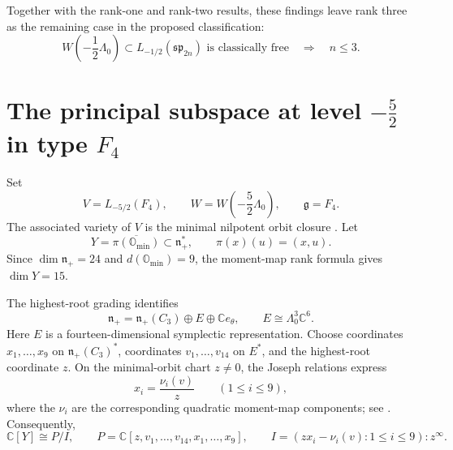 \documentclass[11pt]{amsart}
\newtheorem{corollary}[theorem]{Corollary}
\theoremstyle{definition}
\theoremstyle{remark}
\newcommand{\C}{\mathbb C}
\newcommand{\g}{\mathfrak g}
\newcommand{\spalg}{\mathfrak{sp}}
\begin{document}



Together with the rank-one and rank-two results, these findings
leave rank three as the remaining case in the proposed
classification:
\[
W(-\frac12\Lambda_0)\subset L_{-1/2}(\spalg_{2n})
\text{ is classically free}
\quad\Longrightarrow\quad n\leq3.
\]

\section{The principal subspace at level \texorpdfstring{$-\frac52$}{-5/2} in type \texorpdfstring{$F_4$}{F4}}
\label{subsec:F4-conjecture}

Set
\[
 V=L_{-5/2}(F_4),\qquad W=W(-\frac52\Lambda_0),\qquad\g=F_4.
\]
The associated variety of $V$ is the minimal nilpotent orbit closure
\cite{ArAssoc,AMJoseph}. Let
\[
 Y=\overline{\pi(\mathbb O_{\min})}\subset\mathfrak n_+^*,
 \qquad \pi(x)(u)=(x,u).
\]
Since $\dim\mathfrak n_+=24$ and
$d(\mathbb O_{\min})=9$, the moment-map rank formula gives
$\dim Y=15$.

The highest-root grading identifies
\[
 \mathfrak n_+
 =\mathfrak n_+(C_3)\oplus E\oplus\mathbb Ce_\theta,
 \qquad E\cong\Lambda^3_0\mathbb C^6.
\]
Here $E$ is a fourteen-dimensional symplectic representation.
Choose coordinates $x_1,\ldots,x_9$ on
$\mathfrak n_+(C_3)^*$, coordinates $v_1,\ldots,v_{14}$ on
$E^*$, and the highest-root coordinate $z$.
On the minimal-orbit chart $z\ne0$, the Joseph relations express
\[
 x_i=\frac{\nu_i(v)}{z}\qquad(1\le i\le9),
\]
where the $\nu_i$ are the corresponding quadratic moment-map
components; see \cite[Section~3.2]{BMR}.
Consequently,
\begin{equation}\label{eq:F4-projection-algebra}
 \C[Y]\cong P/I,\qquad
 P=\C[z,v_1,\ldots,v_{14},x_1,\ldots,x_9],\qquad
 I=(zx_i-\nu_i(v):1\le i\le9):z^\infty.
\end{equation}
\end{document}
